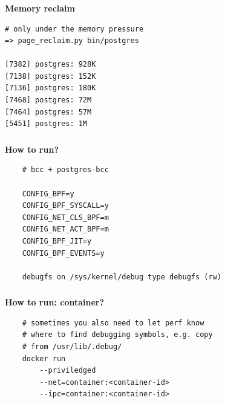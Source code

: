 \documentclass[usenames,dvipsnames, 18pt, compress, aspectratio=169]{beamer}
\begin{document}
\begin{frame}[fragile]{}
    \frametitle{}
    \begin{center}
        \textbf{Memory reclaim}

        \begin{flushleft}
        \begin{verbatim}
# only under the memory pressure
=> page_reclaim.py bin/postgres

[7382] postgres: 928K
[7138] postgres: 152K
[7136] postgres: 180K
[7468] postgres: 72M
[7464] postgres: 57M
[5451] postgres: 1M
        \end{verbatim}
        \end{flushleft}

    \end{center}
\end{frame}

\begin{frame}[fragile]{}
    \frametitle{}
    \begin{center}
        \textbf{How to run?}

		\begin{verbatim}
    # bcc + postgres-bcc

    CONFIG_BPF=y
    CONFIG_BPF_SYSCALL=y
    CONFIG_NET_CLS_BPF=m
    CONFIG_NET_ACT_BPF=m
    CONFIG_BPF_JIT=y
    CONFIG_BPF_EVENTS=y

    debugfs on /sys/kernel/debug type debugfs (rw)
        \end{verbatim}

    \end{center}
\end{frame}

\begin{frame}[fragile]{}
    \frametitle{}
    \begin{center}
        \textbf{How to run: container?}

		\begin{verbatim}
    # sometimes you also need to let perf know
    # where to find debugging symbols, e.g. copy
    # from /usr/lib/.debug/
    docker run
        --priviledged
        --net=container:<container-id>
        --ipc=container:<container-id>
        \end{verbatim}

    \end{center}
\end{frame}
\end{document}
